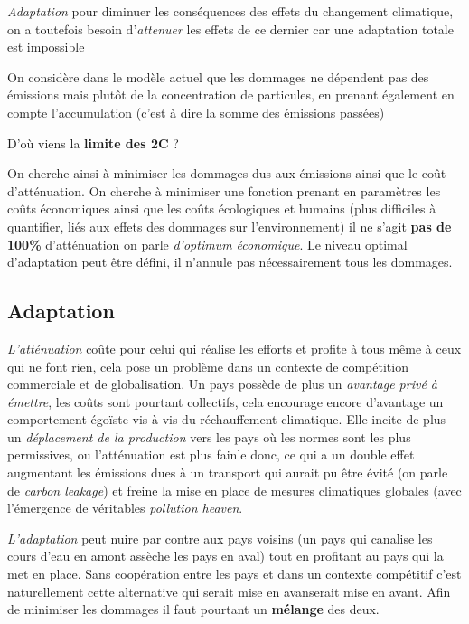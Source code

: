 \documentclass {article}
\newcommand{\V}[0]{\vspace{1\baselineskip}}
\begin{document}
\emph{Adaptation} pour diminuer les conséquences des effets du changement climatique, on a toutefois besoin d'\emph{attenuer} les effets de ce dernier car une adaptation totale est impossible
\V

On considère dans le modèle actuel que les dommages ne dépendent pas des émissions mais plutôt de la concentration de particules, en prenant également en compte l'accumulation (c'est à dire la somme des émissions passées)
\V

D'où viens la \textbf{limite des 2\textdegree C} ?

On cherche ainsi à minimiser les dommages dus aux émissions ainsi que le coût d'atténuation. On cherche à minimiser une fonction prenant en paramètres les coûts économiques ainsi que les coûts écologiques et humains (plus difficiles à quantifier, liés aux effets des dommages sur l'environnement) il ne s'agit \textbf{pas de 100\%} d'atténuation on parle \emph{d'optimum économique}.
Le niveau optimal d'adaptation peut être défini, il n'annule pas nécessairement tous les dommages.

\subsection{Adaptation}
\bigskip

\textit{L'atténuation} coûte pour celui qui réalise les efforts et profite à tous même à ceux qui ne font rien, cela pose un problème dans un contexte de compétition commerciale et de globalisation.
Un pays possède de plus un \emph{avantage privé à émettre}, les coûts sont pourtant collectifs, cela encourage encore d'avantage un comportement égoïste vis à vis du réchauffement climatique.
Elle incite de plus un \emph{déplacement de la production} vers les pays où les normes sont les plus permissives, ou l'atténuation est plus fainle donc, ce qui a un double effet augmentant les émissions dues à un transport qui aurait pu être évité (on parle de \emph{carbon leakage}) et freine la mise en place de mesures climatiques globales (avec l'émergence de véritables \emph{pollution heaven}.
\V

\textit{L'adaptation} peut nuire par contre aux pays voisins (un pays qui canalise les cours d'eau en amont assèche les pays en aval) tout en profitant au pays qui la met en place. Sans coopération entre les pays et dans un contexte compétitif c'est naturellement cette alternative qui serait mise en avanserait mise en avant. 
Afin de minimiser les dommages il faut pourtant un \textbf{mélange} des deux.
\V
\end{document}
